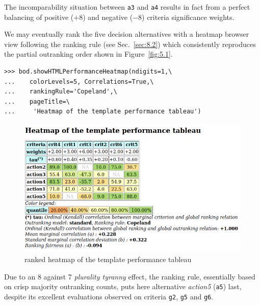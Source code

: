 The incomparability situation between \texttt{a3} and \texttt{a4} results in fact from a perfect balancing of positive ($+8$) and negative ($-8$) criteria significance weights.

We may eventually rank the five decision alternatives with a heatmap browser view following the \Copeland ranking rule (see Sec.~\ref{sec:8.2}) which consistently reproduces the partial outranking order shown in Figure~\vref{fig:5.1}. 
\begin{lstlisting}
>>> bod.showHTMLPerformanceHeatmap(ndigits=1,\
...    colorLevels=5, Correlations=True,\
...    rankingRule='Copeland',\
...    pageTitle=\
...     'Heatmap of the template performance tableau')
\end{lstlisting}
\begin{figure}[ht]
\includegraphics[width=\hsize]{Figures/5-2-templateHeatmapCop.png}
\caption{\Copeland ranked heatmap of the template performance tableau}
\label{fig:5.2}       %
\end{figure}

Due to an 8 against 7 \emph{plurality tyranny} effect, the \Copeland ranking rule, essentially based on crisp majority outranking counts, puts here alternative \emph{action5} (\texttt{a5}) last, despite its excellent evaluations observed on criteria \texttt{g2}, \texttt{g5} and \texttt{g6}.

